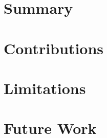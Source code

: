 
\section{Summary}
\label{sec:concl:summary}

\section{Contributions}
\label{sec:concl:contributions}

\section{Limitations}
\label{sec:concl:limitations}

\section{Future Work}
\label{sec:concl:future}
